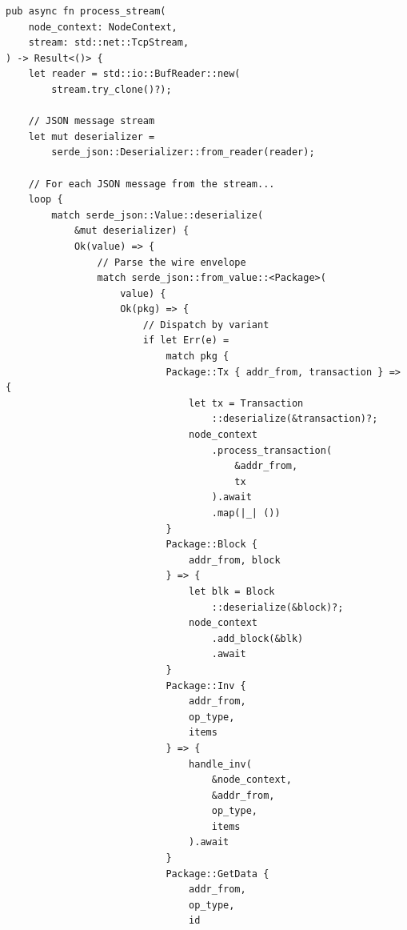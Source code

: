 \begin{listing}[htbp]
\caption{Message dispatcher (simplified)}
\label{lst:ch12-dispatcher}
\begin{verbatim}
pub async fn process_stream(
    node_context: NodeContext,
    stream: std::net::TcpStream,
) -> Result<()> {
    let reader = std::io::BufReader::new(
        stream.try_clone()?);

    // JSON message stream
    let mut deserializer =
        serde_json::Deserializer::from_reader(reader);

    // For each JSON message from the stream...
    loop {
        match serde_json::Value::deserialize(
            &mut deserializer) {
            Ok(value) => {
                // Parse the wire envelope
                match serde_json::from_value::<Package>(
                    value) {
                    Ok(pkg) => {
                        // Dispatch by variant
                        if let Err(e) =
                            match pkg {
                            Package::Tx { addr_from, transaction } => {
                                let tx = Transaction
                                    ::deserialize(&transaction)?;
                                node_context
                                    .process_transaction(
                                        &addr_from,
                                        tx
                                    ).await
                                    .map(|_| ())
                            }
                            Package::Block {
                                addr_from, block
                            } => {
                                let blk = Block
                                    ::deserialize(&block)?;
                                node_context
                                    .add_block(&blk)
                                    .await
                            }
                            Package::Inv {
                                addr_from,
                                op_type,
                                items
                            } => {
                                handle_inv(
                                    &node_context,
                                    &addr_from,
                                    op_type,
                                    items
                                ).await
                            }
                            Package::GetData {
                                addr_from,
                                op_type,
                                id

\end{verbatim}
\end{listing}
